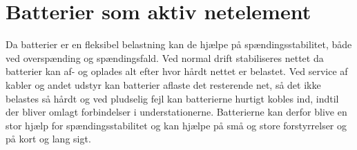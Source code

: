 \section{Batterier som aktiv netelement}

Da batterier er en fleksibel belastning kan de hjælpe på spændingsstabilitet, både ved overspænding og spændingsfald. Ved normal drift stabiliseres nettet da batterier kan af- og oplades alt efter hvor hårdt nettet er belastet. Ved service af kabler og andet udstyr kan batterier aflaste det resterende net, så det ikke belastes så hårdt og ved pludselig fejl kan batterierne hurtigt kobles ind, indtil der bliver omlagt forbindelser i understationerne. Batterierne kan derfor blive en stor hjælp for spændingsstabilitet og kan hjælpe på små og store forstyrrelser og på kort og lang sigt.